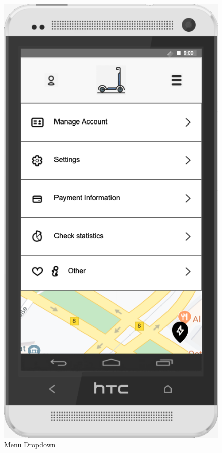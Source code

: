 \documentclass[a4paper, 12pt]{article}
\begin{document}
\begin{figure} [htbp]
  \begin{center}
    \includegraphics[scale=0.6]{03-menu-dropdown.png}
  \end{center}
  \caption{Menu Dropdown}
\end{figure}
\end{document}
